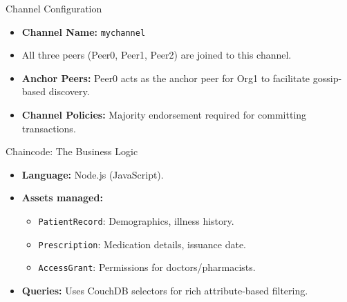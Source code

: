 \documentclass[10pt]{beamer}
\begin{document}
\begin{frame}{Channel Configuration}
    \begin{itemize}
        \item \textbf{Channel Name:} \texttt{mychannel}
        \item All three peers (Peer0, Peer1, Peer2) are joined to this channel.
        \item \textbf{Anchor Peers:} Peer0 acts as the anchor peer for Org1 to facilitate gossip-based discovery.
        \item \textbf{Channel Policies:} Majority endorsement required for committing transactions.
    \end{itemize}
    \vfill
    \begin{center}
    \end{center}
\end{frame}

\begin{frame}{Chaincode: The Business Logic}
    \begin{itemize}
        \item \textbf{Language:} Node.js (JavaScript).
        \item \textbf{Assets managed:}
        \begin{itemize}
            \item \texttt{PatientRecord}: Demographics, illness history.
            \item \texttt{Prescription}: Medication details, issuance date.
            \item \texttt{AccessGrant}: Permissions for doctors/pharmacists.
        \end{itemize}
        \item \textbf{Queries:} Uses CouchDB selectors for rich attribute-based filtering.
    \end{itemize}
\end{frame}
\end{document}
